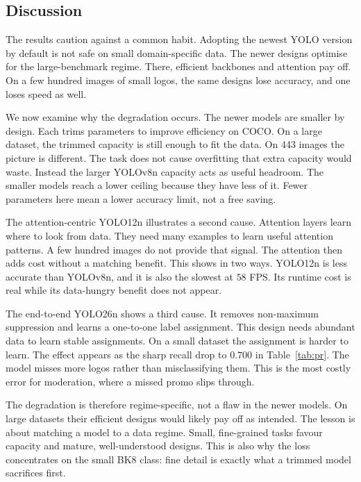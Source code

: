 \documentclass[conference]{IEEEtran}
\begin{document}


\subsection{Discussion}
The results caution against a common habit. Adopting the newest YOLO version by
default is not safe on small domain-specific data. The newer designs optimise
for the large-benchmark regime. There, efficient backbones and attention pay
off. On a few hundred images of small logos, the same designs lose accuracy, and
one loses speed as well.

We now examine why the degradation occurs. The newer models are smaller by
design. Each trims parameters to improve efficiency on COCO. On a large dataset,
the trimmed capacity is still enough to fit the data. On 443 images the picture
is different. The task does not cause overfitting that extra capacity would
waste. Instead the larger YOLOv8n capacity acts as useful headroom. The smaller
models reach a lower ceiling because they have less of it. Fewer parameters here
mean a lower accuracy limit, not a free saving.

The attention-centric YOLO12n illustrates a second cause. Attention layers learn
where to look from data. They need many examples to learn useful attention
patterns. A few hundred images do not provide that signal. The attention then
adds cost without a matching benefit. This shows in two ways. YOLO12n is less
accurate than YOLOv8n, and it is also the slowest at $58$ FPS. Its runtime cost
is real while its data-hungry benefit does not appear.

The end-to-end YOLO26n shows a third cause. It removes non-maximum suppression
and learns a one-to-one label assignment. This design needs abundant data to
learn stable assignments. On a small dataset the assignment is harder to learn.
The effect appears as the sharp recall drop to $0.700$ in Table~\ref{tab:pr}.
The model misses more logos rather than misclassifying them. This is the most
costly error for moderation, where a missed promo slips through.

The degradation is therefore regime-specific, not a flaw in the newer models.
On large datasets their efficient designs would likely pay off as intended. The
lesson is about matching a model to a data regime. Small, fine-grained tasks
favour capacity and mature, well-understood designs. This is also why the loss
concentrates on the small BK8 class: fine detail is exactly what a trimmed model
sacrifices first.
\end{document}
